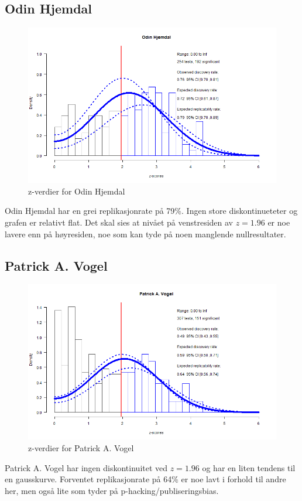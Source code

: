 \documentclass[doc,norsk]{apa7}
\begin{document}
\subsection{Odin Hjemdal}
\begin{figure}[h!]
    \centering
    \includegraphics[width=\textwidth]{images/Odin Hjemdal.png}
    \caption{z-verdier for Odin Hjemdal}
\end{figure}
Odin Hjemdal har en grei replikasjonrate på 79\%. Ingen store diskontinueteter og grafen er relativt flat. Det skal sies at nivået på venstresiden av $z=1.96$ er noe lavere enn på høyresiden, noe som kan tyde på noen manglende nullresultater.

\subsection{Patrick A. Vogel}
\begin{figure}[h!]
    \centering
    \includegraphics[width=\textwidth]{images/Patrick A. Vogel.png}
    \caption{z-verdier for Patrick A. Vogel}
\end{figure}
Patrick A. Vogel har ingen diskontinuitet ved $z=1.96$ og har en liten tendens til en gausskurve. Forventet replikasjonrate på 64\% er noe lavt i forhold til andre her, men også lite som tyder på p-hacking/publiseringsbias.
\end{document}

